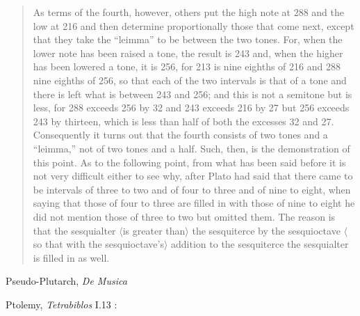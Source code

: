 \documentclass{article}
\theoremstyle{definition}
\begin{document}
\begin{quote}
As terms of the fourth, however, others put the high note at 288 and the low at 216 and then determine proportionally those that come next, except that they take the ``leimma'' to be
 between the two tones. For, when the lower note has been raised a tone, the result is 243 and, when the higher has been lowered a tone, it is 256, for 213 is nine eighths of 216 and
 288 nine eighths of 256, so that each of the two intervals is that of a tone and there is left what is between 243 and 256; and this is not a semitone but
is less, for 288 exceeds 256 by 32 and 243 exceeds 216 by 27 but 256 exceeds 243 by thirteen, which is less than half of both the excesses 32 and 27. Consequently it turns out
that the fourth consists of two tones and a ``leimma,'' not of two tones and a half. Such, then, is the demonstration of this point. As to the following point, from what has been said
before it is not very difficult either to see why, after Plato had said that there came to be intervals of three to two and of four to three and of nine to eight, when saying that those of four
to three are filled in with those of nine to eight he did not mention those of three to two but omitted them. The reason is that the sesquialter {$\langle$}is greater than{$\rangle$} the 
sesquiterce by the sesquioctave {$\langle$}so that with the sesquioctave's{$\rangle$} addition to the sesquiterce the sesquialter is filled in as well.
\end{quote}

Pseudo-Plutarch, {\em De Musica} \cite{LCL428}

Ptolemy, {\em Tetrabiblos} I.13 \cite{LCL435}:
\end{document}
